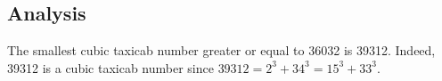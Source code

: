 
\subsection{Analysis}

\begin{example}
	The smallest cubic taxicab number greater or equal to 36032 is 39312. Indeed, 39312 is a cubic taxicab number since $39312 = 2^3 + 34^3 = 15^3 + 33^3$.
\end{example}

